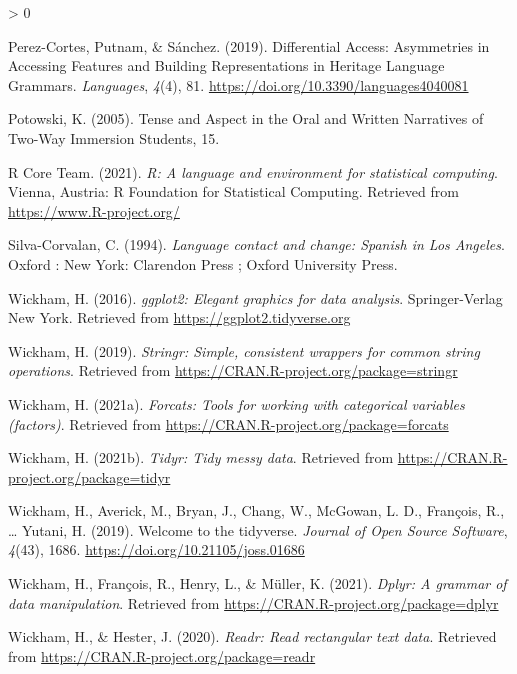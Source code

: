 \documentclass[
  english,
  man]{apa6}
\newlength{\cslhangindent}
\newenvironment{CSLReferences}[2] %
 {%
  \setlength{\parindent}{0pt}
  \ifodd #1 \everypar{\setlength{\hangindent}{\cslhangindent}}\ignorespaces\fi
  \ifnum #2 > 0
  \setlength{\parskip}{#2\baselineskip}
  \fi
 }%
 {}
\begin{document}
\begin{CSLReferences}{1}{0}
\leavevmode\hypertarget{ref-perez-cortes_differential_2019}{}%
Perez-Cortes, Putnam, \& Sánchez. (2019). Differential {Access}: {Asymmetries} in {Accessing} {Features} and {Building} {Representations} in {Heritage} {Language} {Grammars}. \emph{Languages}, \emph{4}(4), 81. \url{https://doi.org/10.3390/languages4040081}

\leavevmode\hypertarget{ref-potowski_tense_2005}{}%
Potowski, K. (2005). Tense and {Aspect} in the {Oral} and {Written} {Narratives} of {Two}-{Way} {Immersion} {Students}, 15.

\leavevmode\hypertarget{ref-R-base}{}%
R Core Team. (2021). \emph{R: A language and environment for statistical computing}. Vienna, Austria: R Foundation for Statistical Computing. Retrieved from \url{https://www.R-project.org/}

\leavevmode\hypertarget{ref-silva-corvalan_language_1994}{}%
Silva-Corvalan, C. (1994). \emph{Language contact and change: {Spanish} in {Los} {Angeles}}. Oxford : New York: Clarendon Press ; Oxford University Press.

\leavevmode\hypertarget{ref-R-ggplot2}{}%
Wickham, H. (2016). \emph{ggplot2: Elegant graphics for data analysis}. Springer-Verlag New York. Retrieved from \url{https://ggplot2.tidyverse.org}

\leavevmode\hypertarget{ref-R-stringr}{}%
Wickham, H. (2019). \emph{Stringr: Simple, consistent wrappers for common string operations}. Retrieved from \url{https://CRAN.R-project.org/package=stringr}

\leavevmode\hypertarget{ref-R-forcats}{}%
Wickham, H. (2021a). \emph{Forcats: Tools for working with categorical variables (factors)}. Retrieved from \url{https://CRAN.R-project.org/package=forcats}

\leavevmode\hypertarget{ref-R-tidyr}{}%
Wickham, H. (2021b). \emph{Tidyr: Tidy messy data}. Retrieved from \url{https://CRAN.R-project.org/package=tidyr}

\leavevmode\hypertarget{ref-R-tidyverse}{}%
Wickham, H., Averick, M., Bryan, J., Chang, W., McGowan, L. D., François, R., \ldots{} Yutani, H. (2019). Welcome to the {tidyverse}. \emph{Journal of Open Source Software}, \emph{4}(43), 1686. \url{https://doi.org/10.21105/joss.01686}

\leavevmode\hypertarget{ref-R-dplyr}{}%
Wickham, H., François, R., Henry, L., \& Müller, K. (2021). \emph{Dplyr: A grammar of data manipulation}. Retrieved from \url{https://CRAN.R-project.org/package=dplyr}

\leavevmode\hypertarget{ref-R-readr}{}%
Wickham, H., \& Hester, J. (2020). \emph{Readr: Read rectangular text data}. Retrieved from \url{https://CRAN.R-project.org/package=readr}


\end{CSLReferences}
\end{document}
